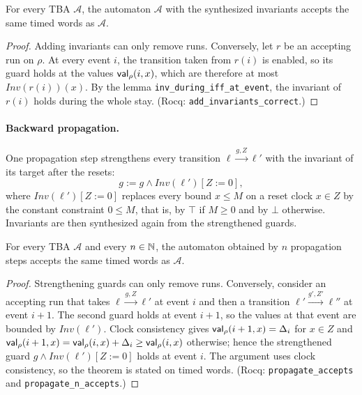 \begin{theorem}
\label{thm:inv-synthesis}
For every TBA $\mathcal A$, the automaton $\mathcal A$ with the synthesized
invariants accepts the same timed words as $\mathcal A$.
\end{theorem}

\begin{proof}
Adding invariants can only remove runs.  Conversely, let $r$ be an accepting
run on $\rho$.  At every event $i$, the transition taken from $r(i)$ is enabled,
so its guard holds at the values $\mathsf{val}_\rho(i,x)$, which are therefore at most
$\mathit{Inv}(r(i))(x)$.  By the lemma \texttt{inv\_\allowbreak{}during\_\allowbreak{}iff\_\allowbreak{}at\_\allowbreak{}event}, the invariant of $r(i)$ holds during
the whole stay.  (Rocq: \texttt{add\_\allowbreak{}invariants\_\allowbreak{}correct}.)
\end{proof}

\paragraph{Backward propagation.}
One propagation step strengthens every transition
$\ell\xrightarrow{g,Z}\ell'$ with the invariant of its target after the
resets:
\[
  g := g\wedge\mathit{Inv}(\ell')[Z:=0],
\]
where $\mathit{Inv}(\ell')[Z:=0]$ replaces every bound $x\le M$ on a reset clock
$x\in Z$ by the constant constraint $0\le M$, that is, by $\top$ if $M\ge0$ and
by $\bot$ otherwise.  Invariants are then synthesized again from the
strengthened guards.

\begin{theorem}
\label{thm:propagation}
For every TBA $\mathcal A$ and every $n\in\mathbb{N}$, the automaton obtained by
$n$ propagation steps accepts the same timed words as $\mathcal A$.
\end{theorem}

\begin{proof}
Strengthening guards can only remove runs.  Conversely, consider an accepting
run that takes $\ell\xrightarrow{g,Z}\ell'$ at event $i$ and then a transition
$\ell'\xrightarrow{g',Z'}\ell''$ at event $i+1$.  The second guard holds at event
$i+1$, so the values at that event are bounded by $\mathit{Inv}(\ell')$.  Clock
consistency gives $\mathsf{val}_\rho(i+1,x)=\Delta_i$ for $x\in Z$ and
$\mathsf{val}_\rho(i+1,x)=\mathsf{val}_\rho(i,x)+\Delta_i\ge\mathsf{val}_\rho(i,x)$ otherwise; hence
the strengthened guard $g\wedge\mathit{Inv}(\ell')[Z:=0]$ holds at event $i$.
The argument uses clock consistency, so the theorem is stated on timed words.
(Rocq: \texttt{propagate\_\allowbreak{}accepts} and
\texttt{propagate\_\allowbreak{}n\_\allowbreak{}accepts}.)
\end{proof}

